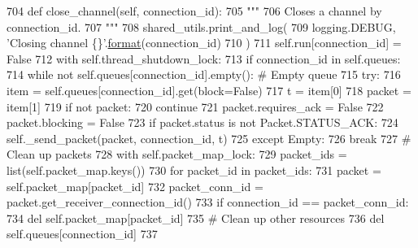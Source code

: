 \begin{DoxyCode}
704     \textcolor{keyword}{def }close\_channel(self, connection\_id):
705         \textcolor{stringliteral}{"""}
706 \textcolor{stringliteral}{        Closes a channel by connection\_id.}
707 \textcolor{stringliteral}{        """}
708         shared\_utils.print\_and\_log(
709             logging.DEBUG, \textcolor{stringliteral}{'Closing channel \{\}'}.\hyperlink{namespaceparlai_1_1chat__service_1_1services_1_1messenger_1_1shared__utils_a32e2e2022b824fbaf80c747160b52a76}{format}(connection\_id)
710         )
711         self.run[connection\_id] = \textcolor{keyword}{False}
712         with self.thread\_shutdown\_lock:
713             \textcolor{keywordflow}{if} connection\_id \textcolor{keywordflow}{in} self.queues:
714                 \textcolor{keywordflow}{while} \textcolor{keywordflow}{not} self.queues[connection\_id].empty():  \textcolor{comment}{# Empty queue}
715                     \textcolor{keywordflow}{try}:
716                         item = self.queues[connection\_id].get(block=\textcolor{keyword}{False})
717                         t = item[0]
718                         packet = item[1]
719                         \textcolor{keywordflow}{if} \textcolor{keywordflow}{not} packet:
720                             \textcolor{keywordflow}{continue}
721                         packet.requires\_ack = \textcolor{keyword}{False}
722                         packet.blocking = \textcolor{keyword}{False}
723                         \textcolor{keywordflow}{if} packet.status \textcolor{keywordflow}{is} \textcolor{keywordflow}{not} Packet.STATUS\_ACK:
724                             self.\_send\_packet(packet, connection\_id, t)
725                     \textcolor{keywordflow}{except} Empty:
726                         \textcolor{keywordflow}{break}
727                 \textcolor{comment}{# Clean up packets}
728                 with self.packet\_map\_lock:
729                     packet\_ids = list(self.packet\_map.keys())
730                     \textcolor{keywordflow}{for} packet\_id \textcolor{keywordflow}{in} packet\_ids:
731                         packet = self.packet\_map[packet\_id]
732                         packet\_conn\_id = packet.get\_receiver\_connection\_id()
733                         \textcolor{keywordflow}{if} connection\_id == packet\_conn\_id:
734                             del self.packet\_map[packet\_id]
735                 \textcolor{comment}{# Clean up other resources}
736                 del self.queues[connection\_id]
737 
\end{DoxyCode}
\mbox{\label{classparlai_1_1mturk_1_1core_1_1socket__manager_1_1SocketManager_a17a6ebab4a3c0e2882ba01398f2e9df1}} 
